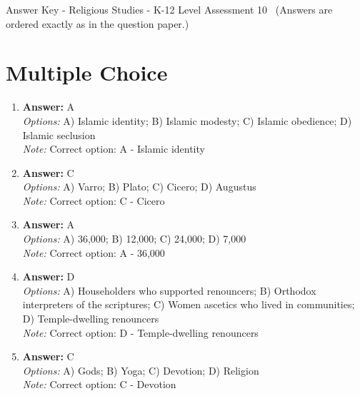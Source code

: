 \documentclass[12pt]{article}
\begin{document}
\begin{center}
Answer Key - Religious Studies - K-12 Level Assessment 10 \
\small (Answers are ordered exactly as in the question paper.)
\end{center}

\section*{Multiple Choice}
\begin{enumerate}[label=\arabic*.]
\item \textbf{Answer:} A
\\ \textit{Options:} A) Islamic identity; B) Islamic modesty; C) Islamic obedience; D) Islamic seclusion
\\ \textit{Note:} Correct option: A - Islamic identity
\item \textbf{Answer:} C
\\ \textit{Options:} A) Varro; B) Plato; C) Cicero; D) Augustus
\\ \textit{Note:} Correct option: C - Cicero
\item \textbf{Answer:} A
\\ \textit{Options:} A) 36,000; B) 12,000; C) 24,000; D) 7,000
\\ \textit{Note:} Correct option: A - 36,000
\item \textbf{Answer:} D
\\ \textit{Options:} A) Householders who supported renouncers; B) Orthodox interpreters of the scriptures; C) Women ascetics who lived in communities; D) Temple-dwelling renouncers
\\ \textit{Note:} Correct option: D - Temple-dwelling renouncers
\item \textbf{Answer:} C
\\ \textit{Options:} A) Gods; B) Yoga; C) Devotion; D) Religion
\\ \textit{Note:} Correct option: C - Devotion
\end{enumerate}
\end{document}
